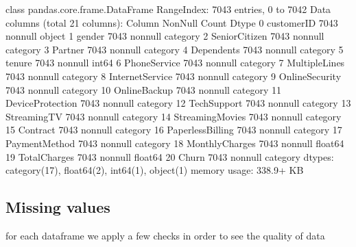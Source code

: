 \documentclass[letterpaper,10pt,english]{jupyterBook}
\begin{document}
\begin{sphinxVerbatim}[commandchars=\\\{\}]
\PYGZlt{}class \PYGZsq{}pandas.core.frame.DataFrame\PYGZsq{}\PYGZgt{}
RangeIndex: 7043 entries, 0 to 7042
Data columns (total 21 columns):
 \PYGZsh{}   Column            Non\PYGZhy{}Null Count  Dtype   
\PYGZhy{}\PYGZhy{}\PYGZhy{}  \PYGZhy{}\PYGZhy{}\PYGZhy{}\PYGZhy{}\PYGZhy{}\PYGZhy{}            \PYGZhy{}\PYGZhy{}\PYGZhy{}\PYGZhy{}\PYGZhy{}\PYGZhy{}\PYGZhy{}\PYGZhy{}\PYGZhy{}\PYGZhy{}\PYGZhy{}\PYGZhy{}\PYGZhy{}\PYGZhy{}  \PYGZhy{}\PYGZhy{}\PYGZhy{}\PYGZhy{}\PYGZhy{}   
 0   customerID        7043 non\PYGZhy{}null   object  
 1   gender            7043 non\PYGZhy{}null   category
 2   SeniorCitizen     7043 non\PYGZhy{}null   category
 3   Partner           7043 non\PYGZhy{}null   category
 4   Dependents        7043 non\PYGZhy{}null   category
 5   tenure            7043 non\PYGZhy{}null   int64   
 6   PhoneService      7043 non\PYGZhy{}null   category
 7   MultipleLines     7043 non\PYGZhy{}null   category
 8   InternetService   7043 non\PYGZhy{}null   category
 9   OnlineSecurity    7043 non\PYGZhy{}null   category
 10  OnlineBackup      7043 non\PYGZhy{}null   category
 11  DeviceProtection  7043 non\PYGZhy{}null   category
 12  TechSupport       7043 non\PYGZhy{}null   category
 13  StreamingTV       7043 non\PYGZhy{}null   category
 14  StreamingMovies   7043 non\PYGZhy{}null   category
 15  Contract          7043 non\PYGZhy{}null   category
 16  PaperlessBilling  7043 non\PYGZhy{}null   category
 17  PaymentMethod     7043 non\PYGZhy{}null   category
 18  MonthlyCharges    7043 non\PYGZhy{}null   float64 
 19  TotalCharges      7043 non\PYGZhy{}null   float64 
 20  Churn             7043 non\PYGZhy{}null   category
dtypes: category(17), float64(2), int64(1), object(1)
memory usage: 338.9+ KB
\end{sphinxVerbatim}


\subsection{Missing values}
\label{\detokenize{c7_case_studies/Churn:missing-values}}
\sphinxAtStartPar
for each dataframe we apply a few checks in order to see the quality of data

\begin{sphinxVerbatim}[commandchars=\\\{\}]
\PYG{p}{[}\PYG{p}{]}
\end{sphinxVerbatim}
\end{document}

